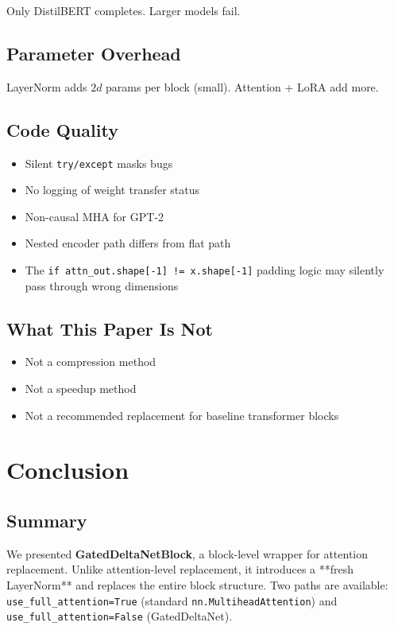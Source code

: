 Only DistilBERT completes. Larger models fail.

\subsection{Parameter Overhead}

LayerNorm adds $2d$ params per block (small). Attention + LoRA add more.

\subsection{Code Quality}

\begin{itemize}
\item Silent \texttt{try/except} masks bugs
\item No logging of weight transfer status
\item Non-causal MHA for GPT-2
\item Nested encoder path differs from flat path
\item The \texttt{if attn\_out.shape[-1] != x.shape[-1]} padding logic may silently
  pass through wrong dimensions

\end{itemize}
\subsection{What This Paper Is Not}

\begin{itemize}
\item Not a compression method
\item Not a speedup method
\item Not a recommended replacement for baseline transformer blocks

\end{itemize}



\section{Conclusion}

\subsection{Summary}

We presented \textbf{GatedDeltaNetBlock}, a block-level wrapper for attention 
replacement. Unlike attention-level replacement, it introduces a **fresh 
LayerNorm** and replaces the entire block structure. Two paths are 
available: \texttt{use\_full\_attention=True} (standard \texttt{nn.MultiheadAttention}) 
and \texttt{use\_full\_attention=False} (GatedDeltaNet).

